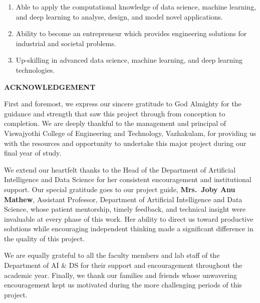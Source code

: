 \documentclass[12pt,a4paper]{report}
\begin{document}
\vspace{0.4cm}
\par\vspace{0.2cm}
\begin{enumerate}[leftmargin=0.5in, label=\arabic*., topsep=4pt, itemsep=3pt]
    \item Able to apply the computational knowledge of data science, machine learning, and deep learning to analyse, design, and model novel applications.
    \item Ability to become an entrepreneur which provides engineering solutions for industrial and societal problems.
    \item Up-skilling in advanced data science, machine learning, and deep learning technologies.
\end{enumerate}
\clearpage

\clearpage
\pagestyle{empty}
\begin{center}
    {\large\bfseries ACKNOWLEDGEMENT}
\end{center}
\vspace{0.5cm}

\noindent
First and foremost, we express our sincere gratitude to God Almighty for the guidance and strength that saw this project through from conception to completion. We are deeply thankful to the management and principal of Viswajyothi College of Engineering and Technology, Vazhakulam, for providing us with the resources and opportunity to undertake this major project during our final year of study.

\vspace{0.4cm}
\noindent
We extend our heartfelt thanks to the Head of the Department of Artificial Intelligence and Data Science for her consistent encouragement and institutional support. Our special gratitude goes to our project guide, \textbf{Mrs.\ Joby Anu Mathew}, Assistant Professor, Department of Artificial Intelligence and Data Science, whose patient mentorship, timely feedback, and technical insight were invaluable at every phase of this work. Her ability to direct us toward productive solutions while encouraging independent thinking made a significant difference in the quality of this project.

\vspace{0.4cm}
\noindent
We are equally grateful to all the faculty members and lab staff of the Department of AI \& DS for their support and encouragement throughout the academic year. Finally, we thank our families and friends whose unwavering encouragement kept us motivated during the more challenging periods of this project.
\clearpage
\end{document}
